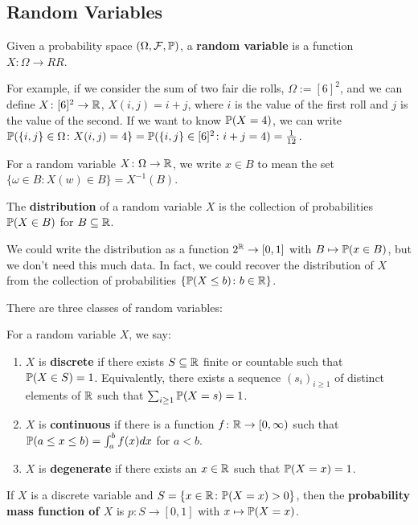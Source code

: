 \subsection{Random Variables}

\begin{defbox}
   Given a probability space $(\Omega, \mathcal{F}, \mathbb{P})$, a \textbf{random variable} is a function $X \colon \Omega \to RR$.
\end{defbox}

For example, if we consider the sum of two fair die rolls, $\Omega := [6]^2$, and we can define $X \colon [6]^2 \to \mathbb{R}$, $X(i,j) = i + j$, where $i$ is the value of the first roll and $j$ is the value of the second. If we want to know $\mathbb{P}(X = 4)$, we can write $\mathbb{P}(\{i,j\} \in \Omega \colon X(i, j) = 4 \} = \mathbb{P}(\{i, j\} \in [6]^2 \colon i + j = 4) = \frac{1}{12}$.

For a random variable $X \colon \Omega \to \mathbb{R}$, we write $x \in B$ to mean the set $\{\omega \in B \colon X(w) \in B\} = X^{-1}(B)$.

\begin{defbox}
   The \textbf{distribution} of a random variable $X$ is the collection of probabilities $\mathbb{P}(X \in B)$ for $B \subseteq \mathbb{R}$. 
\end{defbox}

  We could write the distribution as a function $2^{\mathbb{R}} \to [0,1]$ with $B \mapsto \mathbb{P}(x \in B)$, but we don't need this much data. In fact, we could recover the distribution of $X$ from the collection of probabilities $\{\mathbb{P}(X \leq b) \colon b \in \mathbb{R}\}$.

  There are three classes of random variables:

\begin{defbox}
   For a random variable $X$, we say:
   \begin{enumerate}
      \item $X$ is \textbf{discrete} if there exists $S \subseteq \mathbb{R}$ finite or countable such that $\mathbb{P}(X \in S) = 1$. Equivalently, there exists a sequence $(s_i)_{i \geq 1}$ of distinct elements of $\mathbb{R}$ such that $\sum_{i \geq 1}\mathbb{P}(X = s) = 1$. 
      \item $X$ is \textbf{continuous} if there is a function $f \colon \mathbb{R} \to [0, \infty)$ such that $\mathbb{P}(a \leq x \leq b) = \int_{a}^{b}f(x) dx$ for $a < b$. 
      \item $X$ is \textbf{degenerate} if there exists an $x \in \mathbb{R}$ such that $\mathbb{P}(X = x) = 1$. 
   \end{enumerate}
\end{defbox}

If $X$ is a discrete variable and $S = \{x \in \mathbb{R} \colon \mathbb{P}(X = x) > 0\}$, then the \textbf{probability mass function of $X$} is $p \colon S \to [0,1]$ with $x \mapsto \mathbb{P}(X = x)$.  
